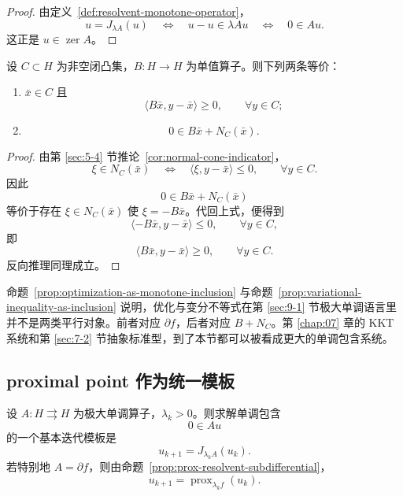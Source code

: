 \begin{proof}
由定义~\ref{def:resolvent-monotone-operator}，
\[
u=J_{\lambda A}(u)
\quad\Longleftrightarrow\quad
u-u\in \lambda A u
\quad\Longleftrightarrow\quad
0\in A u.
\]
这正是 $u\in \operatorname{zer} A$。
\end{proof}

\begin{proposition}[变分不等式也是单调包含]\label{prop:variational-inequality-as-inclusion}
设 $C\subset H$ 为非空闭凸集，$B\colon H\to H$ 为单值算子。则下列两条等价：
\begin{enumerate}
  \item $\bar x\in C$ 且
  \[
  \langle B\bar x,y-\bar x\rangle\ge 0,\qquad \forall y\in C;
  \]
  \item
  \[
  0\in B\bar x+N_C(\bar x).
  \]
\end{enumerate}
\end{proposition}

\begin{proof}
由第 \ref{sec:5-4} 节推论~\ref{cor:normal-cone-indicator}，
\[
\xi\in N_C(\bar x)
\quad\Longleftrightarrow\quad
\langle \xi,y-\bar x\rangle\le 0,\qquad \forall y\in C.
\]
因此
\[
0\in B\bar x+N_C(\bar x)
\]
等价于存在 $\xi\in N_C(\bar x)$ 使 $\xi=-B\bar x$。代回上式，便得到
\[
\langle -B\bar x,y-\bar x\rangle\le 0,\qquad \forall y\in C,
\]
即
\[
\langle B\bar x,y-\bar x\rangle\ge 0,\qquad \forall y\in C.
\]
反向推理同理成立。
\end{proof}

\begin{remark}
命题~\ref{prop:optimization-as-monotone-inclusion} 与命题~\ref{prop:variational-inequality-as-inclusion} 说明，优化与变分不等式在第 \ref{sec:9-1} 节极大单调语言里并不是两类平行对象。前者对应 $\partial f$，后者对应 $B+N_C$。第 \ref{chap:07} 章的 KKT 系统和第 \ref{sec:7-2} 节抽象标准型，到了本节都可以被看成更大的单调包含系统。
\end{remark}

\subsection{proximal point 作为统一模板}

\begin{corollary}\label{cor:proximal-point-template}
设 $A\colon H\rightrightarrows H$ 为极大单调算子，$\lambda_k>0$。则求解单调包含
\[
0\in Au
\]
的一个基本迭代模板是
\[
u_{k+1}=J_{\lambda_k A}(u_k).
\]
若特别地 $A=\partial f$，则由命题~\ref{prop:prox-resolvent-subdifferential}，
\[
u_{k+1}=\operatorname{prox}_{\lambda_k f}(u_k).
\]
\end{corollary}

